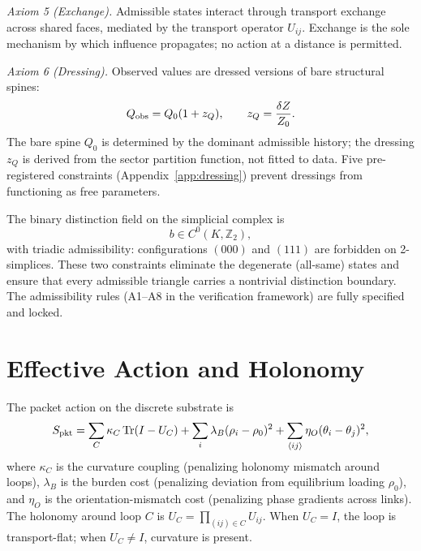 \documentclass[11pt,twocolumn]{article}
\begin{document}
\emph{Axiom 5 (Exchange).}
Admissible states interact through transport exchange across shared faces, mediated by the transport operator $U_{ij}$.
Exchange is the sole mechanism by which influence propagates; no action at a distance is permitted.

\emph{Axiom 6 (Dressing).}
Observed values are dressed versions of bare structural spines:
\begin{equation}
\label{eq:dressing}
Q_{\rm obs} = Q_0(1 + z_Q), \qquad z_Q = \frac{\delta Z}{Z_0}.
\end{equation}
The bare spine $Q_0$ is determined by the dominant admissible history; the dressing $z_Q$ is derived from the sector partition function, not fitted to data.
Five pre-registered constraints (Appendix~\ref{app:dressing}) prevent dressings from functioning as free parameters.

The binary distinction field on the simplicial complex is
\begin{equation}
\label{eq:bfield}
b \in C^0(K, \mathbb{Z}_2),
\end{equation}
with triadic admissibility: configurations $(000)$ and $(111)$ are forbidden on 2-simplices.
These two constraints eliminate the degenerate (all-same) states and ensure that every admissible triangle carries a nontrivial distinction boundary.\cite{gravityprog}
The admissibility rules (A1--A8 in the verification framework) are fully specified and locked.


\section{Effective Action and Holonomy}
\label{sec:action}

The packet action on the discrete substrate is
\begin{equation}
\label{eq:packet-action}
S_{\rm pkt} = \sum_C \kappa_C\,\mathrm{Tr}(I - U_C) + \sum_i \lambda_B(\rho_i - \rho_0)^2 + \sum_{\langle ij\rangle} \eta_O(\theta_i - \theta_j)^2,
\end{equation}
where $\kappa_C$ is the curvature coupling (penalizing holonomy mismatch around loops), $\lambda_B$ is the burden cost (penalizing deviation from equilibrium loading $\rho_0$), and $\eta_O$ is the orientation-mismatch cost (penalizing phase gradients across links).
The holonomy around loop $C$ is $U_C = \prod_{(ij)\in C} U_{ij}$.
When $U_C = I$, the loop is transport-flat; when $U_C \neq I$, curvature is present.
\end{document}
